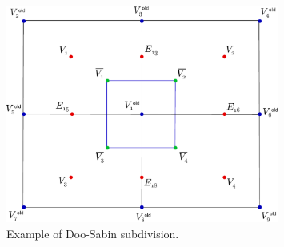 \begin{figure}
\begin{center}
\centering
  \includegraphics[width=0.8\textwidth]{./img/subdivisiondoo}
 \caption{Example of Doo-Sabin subdivision.}
 \label{fig:subdivisionDoo}
\end{center}
\end{figure}




